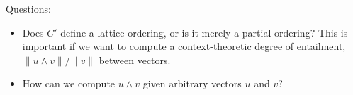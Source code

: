 \documentclass{article}
\begin{document}
Questions:
\begin{itemize}
\item Does $C'$ define a lattice ordering, or is it merely a partial
  ordering? This is important if we want to compute a
  context-theoretic degree of entailment, $\|u\land v\|/\|v\|$ between
  vectors.
\item How can we compute $u\land v$ given arbitrary vectors $u$ and
  $v$?
\end{itemize}





\end{document}
